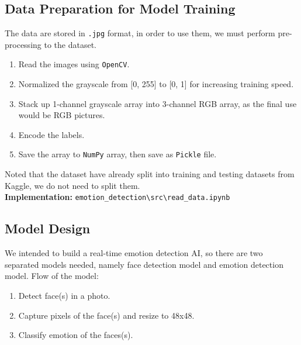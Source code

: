 \documentclass[11pt,a4paper]{article}
\begin{document}
    \subsection{Data Preparation for Model Training}
    The data are stored in \texttt{.jpg} format, in order to use them, we must perform pre-processing to the dataset.
    \begin{enumerate}
        \item Read the images using \texttt{OpenCV}.
        \item Normalized the grayscale from [0, 255] to [0, 1] for increasing training speed.
        \item Stack up 1-channel grayscale array into 3-channel RGB array, as the final use would be RGB pictures.
        \item Encode the labels.
        \item Save the array to \texttt{NumPy} array, then save as \texttt{Pickle} file.
    \end{enumerate}
    Noted that the dataset have already split into training and testing datasets from Kaggle, we do not need to split them. \\
    \textbf{Implementation:} \texttt{emotion\_detection\textbackslash src\textbackslash read\_data.ipynb}
        
    
    
    \subsection{Model Design}
    We intended to build a real-time emotion detection AI, so there are two separated models needed, namely face detection model and emotion detection model. Flow of the model:
    \begin{enumerate}
        \item Detect face(s) in a photo.
        \item Capture pixels of the face(s) and resize to 48x48.
        \item Classify emotion of the faces(s).
    \end{enumerate}
    
\end{document}

